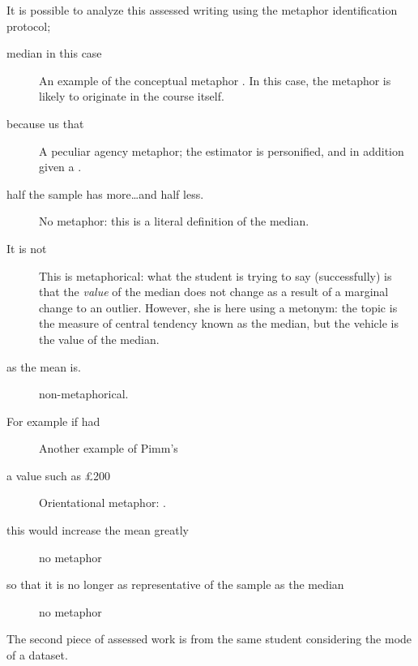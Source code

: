 \noindent It is possible to analyze this assessed writing using the
 metaphor identification protocol;

\begin{description}
\item[ median  in this case]\qquad An
  example of the conceptual metaphor .  In
  this case, the metaphor is likely to originate in the course itself.
\item[because  us that]\qquad A peculiar agency
  metaphor; the estimator is personified, and in addition given a
  .
\item[half the sample has more\ldots and half less.]\qquad No
  metaphor: this is a literal definition of the median.
\item[It is not ]\qquad This is
  metaphorical: what the student is trying to say (successfully) is
  that the \emph{value} of the median does not change as a result of a
  marginal change to an outlier.  However, she is here using a
  metonym: the topic is the measure of central tendency known as the
  median, but the vehicle is the value of the median.
\item[as the mean is.]\qquad non-metaphorical.
\item[For example if  had]\qquad Another example of
  Pimm's 
\item[a  value such as \pounds 200]\qquad
  Orientational metaphor: .
\item[this would increase the mean greatly]\qquad no metaphor
\item[so that it is no longer as representative of the sample as the
  median]\qquad no metaphor
\end{description}
  
\noindent
The second piece of assessed work is from the same student considering
the mode of a dataset.

\begin{singlespace}
\begin{quote}
\end{quote}
\end{singlespace}

